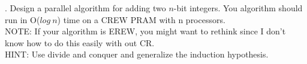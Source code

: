 \documentclass[10pt]{article}
\begin{document}
. Design a parallel algorithm for adding two $n$-bit integers. You algorithm should run in O($log~n$) time
on a CREW PRAM with n processors.\\
NOTE: If your algorithm is EREW, you might want to rethink since I don't know how to do this easily
with out CR.\\
HINT: Use divide and conquer and generalize the induction hypothesis.
\end{document}
